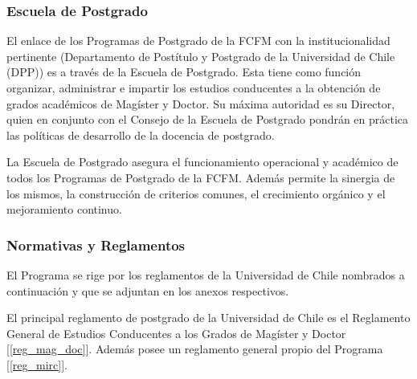 
\subsubsection{Escuela de Postgrado}

El enlace de los Programas de Postgrado de la FCFM con la institucionalidad pertinente
(Departamento de Postítulo y Postgrado de la Universidad de Chile (DPP)) es a través de la Escuela
de Postgrado. Esta tiene como función organizar, administrar e impartir los estudios conducentes
a la obtención de grados académicos de Magíster y Doctor. Su máxima autoridad es su Director,
quien en conjunto con el Consejo de la Escuela de Postgrado pondrán en práctica las políticas de
desarrollo de la docencia de postgrado.

La Escuela de Postgrado asegura el funcionamiento operacional y académico de todos los
Programas de Postgrado de la FCFM. Además permite la sinergia de los mismos, la construcción
de criterios comunes, el crecimiento orgánico y el mejoramiento continuo.

\subsubsection{Normativas y Reglamentos}

El Programa se rige por los reglamentos de la Universidad de Chile nombrados a continuación y
que se adjuntan en los anexos respectivos.

El principal reglamento de postgrado de la Universidad de Chile es el Reglamento General
de Estudios Conducentes a los Grados de Magíster y Doctor [\ref{reg_mag_doc}]. Además posee un reglamento
general propio del Programa [\ref{reg_mirc}].

